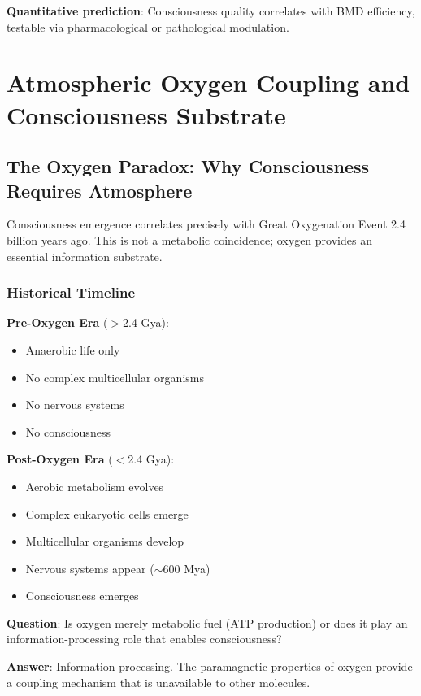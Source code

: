 \documentclass[11pt,onecolumn]{article}
\begin{document}
\textbf{Quantitative prediction}: Consciousness quality correlates with BMD efficiency, testable via pharmacological or pathological modulation.

\clearpage

\section{Atmospheric Oxygen Coupling and Consciousness Substrate}

\subsection{The Oxygen Paradox: Why Consciousness Requires Atmosphere}

Consciousness emergence correlates precisely with Great Oxygenation Event 2.4 billion years ago. This is not a metabolic coincidence; oxygen provides an essential information substrate.

\subsubsection{Historical Timeline}

\textbf{Pre-Oxygen Era} ($>$2.4 Gya):
\begin{itemize}
    \item Anaerobic life only
    \item No complex multicellular organisms
    \item No nervous systems
    \item No consciousness
\end{itemize}

\textbf{Post-Oxygen Era} ($<$2.4 Gya):
\begin{itemize}
  \item Aerobic metabolism evolves
  \item Complex eukaryotic cells emerge
  \item Multicellular organisms develop
  \item Nervous systems appear ($\sim$600 Mya)
  \item Consciousness emerges
\end{itemize}

\textbf{Question}: Is oxygen merely metabolic fuel (ATP production) or does it play an information-processing role that enables consciousness?

\textbf{Answer}: Information processing. The paramagnetic properties of oxygen provide a coupling mechanism that is unavailable to other molecules.
\end{document}
